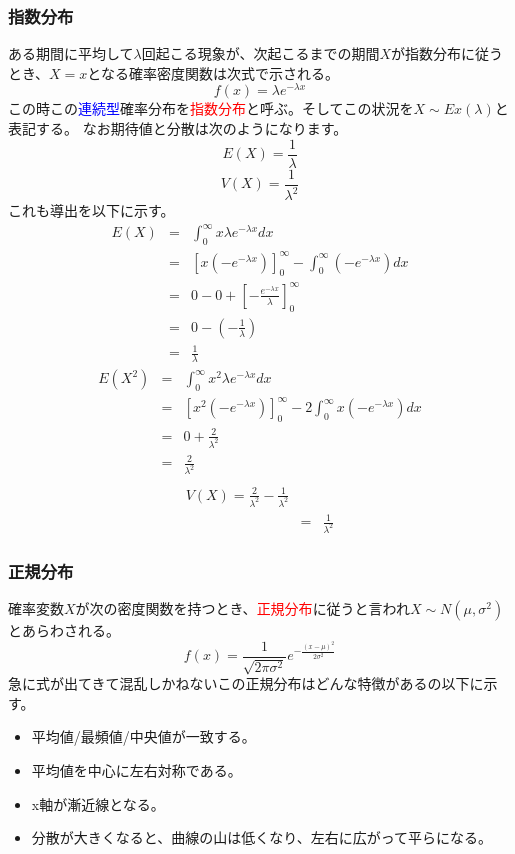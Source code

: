 \documentclass[a4paper,10pt]{jarticle}
\begin{document}
\subsubsection{指数分布}
ある期間に平均して$\lambda$回起こる現象が、次起こるまでの期間$X$が指数分布に従うとき、$X=x$となる確率密度関数は次式で示される。
\begin{equation}
    f(x) = \lambda e^{-\lambda x}\tag{3,17}
\end{equation}
この時この\textcolor{blue}{連続型}確率分布を\textcolor{red}{指数分布}と呼ぶ。そしてこの状況を$X\sim Ex(\lambda)$と表記する。
なお期待値と分散は次のようになります。
\begin{equation}
    E(X)=\frac{1}{\lambda}\tag{3,18}
\end{equation}
\begin{equation}
    V(X)=\frac{1}{\lambda^2}\tag{3,19}
\end{equation}
これも導出を以下に示す。
\begin{eqnarray*}
    E(X) &=& \int_0^\infty x\lambda e^{-\lambda x}dx \\
    &=& \left[x(-e^{-\lambda x})\right]_0^\infty -\int_0^\infty(-e^{-\lambda x})dx\\
    &=& 0-0+\left[-\frac{e^{-\lambda x}}{\lambda}\right]_0^\infty\\
    &=& 0-(-\frac{1}{\lambda})\\
    &=& \frac{1}{\lambda}
\end{eqnarray*}
\begin{eqnarray*}
    E(X^2)&=& \int_0^\infty x^2\lambda e^{-\lambda x}dx \\
    &=& \left[x^2(-e^{-\lambda x})\right]_0^\infty -2\int_0^\infty x(-e^{-\lambda x})dx\\
    &=& 0+\frac{2}{\lambda^2}\\
    &=& \frac{2}{\lambda^2}\\
\end{eqnarray*}
\begin{eqnarray*}
    V(X) = \frac{2}{\lambda^2} - \frac{1}{\lambda^2}\\
    &=& \frac{1}{\lambda^2}
\end{eqnarray*}
\subsubsection{正規分布}
確率変数$X$が次の密度関数を持つとき、\textcolor{red}{正規分布}に従うと言われ$X\sim N(\mu,\sigma^2)$とあらわされる。
\begin{equation}
    f(x) = \frac{1}{\sqrt{2\pi\sigma^2}}e^{-\frac{(x-\mu)^2}{2\sigma^2}}\tag{3,13}
\end{equation}
急に式が出てきて混乱しかねないこの正規分布はどんな特徴があるの以下に示す。
\begin{itemize}
    \item 平均値/最頻値/中央値が一致する。
    \item 平均値を中心に左右対称である。
    \item x軸が漸近線となる。
    \item 分散が大きくなると、曲線の山は低くなり、左右に広がって平らになる。
\end{itemize}
\end{document}
